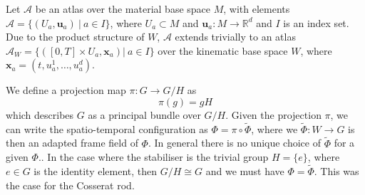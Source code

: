 Let $\mathcal{A}$ be an atlas over the material base space $M$, with elements  $\mathcal{A} = \{ (U_a, \mathbf{u}_a)\ |\ a \in I \}$, where $U_a \subset M$ and $\mathbf{u}_a : M \to \mathbb{R}^d$ and $I$ is an index set. Due to the product structure of $W$, $\mathcal{A}$ extends trivially to an atlas $\mathcal{A}_W = \{ ([0, T] \times U_a , \mathbf{x}_a) |\ a \in I \}$ over the kinematic base space $W$, where $\mathbf{x}_a = (t, u_a^1, \dots, u^d_a)$.

We define a projection map $\pi : G \to G/H$ as
\begin{equation}
\pi(g) = gH
\end{equation}
which describes $G$ as a principal bundle over $G/H$. Given the projection $\pi$, we can write the spatio-temporal configuration as $\Phi = \pi \circ \tilde{\Phi}$, where we $\tilde{\Phi} : W \to G$ is then an adapted frame field of $\Phi$. In general there is no unique choice of $\tilde{\Phi}$ for a given $\Phi$.. In the case where the stabiliser is the trivial group $H = \{ e \}$, where $e \in G$ is the identity element, then $G/H \cong G$ and we must have $\Phi = \tilde{\Phi}$. This was the case for the Cosserat rod.

